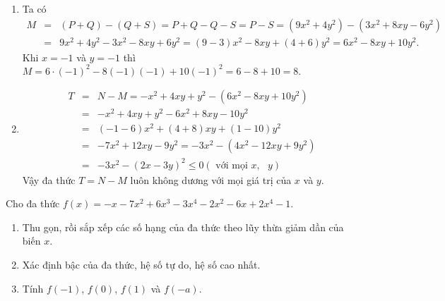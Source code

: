 \begin{bt}
{\begin{enumerate}
\begin{itemize}
			\end{itemize}
			\item Ta có 
			\begin{eqnarray*}
				M&=&(P+Q)-(Q+S)=P+Q-Q-S=P-S=(9x^2+4y^2)-(3x^2+8xy-6y^2)\\
				&=&9x^2+4y^2-3x^2-8xy+6y^2=(9-3)x^2-8xy+(4+6)y^2=6x^2-8xy+10y^2.
			\end{eqnarray*}
			Khi $x=-1$ và $y=-1$ thì $M=6\cdot (-1)^2-8(-1)(-1)+10(-1)^2=6-8+10=8.$
			\item \begin{eqnarray*}
				T&=&N-M=-x^2+4xy+y^2-(6x^2-8xy+10y^2)\\
				&=&-x^2+4xy+y^2-6x^2+8xy-10y^2\\
				&=&(-1-6)x^2+(4+8)xy+(1-10)y^2\\
				&=&-7x^2+12xy-9y^2=-3x^2-(4x^2-12xy+9y^2)\\
				&=&-3x^2-(2x-3y)^2\le 0 (\text{ với mọi }x,\text{ }y)
			\end{eqnarray*}
			Vậy đa thức $T=N-M$ luôn không dương với mọi giá trị của $x$ và $y$.
		\end{enumerate}
	}
\end{bt}

\begin{bt}%
	Cho đa thức $f(x)=-x-7x^2+6x^3-3x^4-2x^2-6x+2x^4-1$.
	\begin{enumerate}
		\item Thu gọn, rồi sắp xếp các số hạng của đa thức theo lũy thừa giảm dần của biến $x$.
		\item Xác định bậc của đa thức, hệ số tự do, hệ số cao nhất.
		\item Tính $f(-1)$, $f(0)$, $f(1)$ và $f(-a)$.
	\end{enumerate}
\end{bt}

